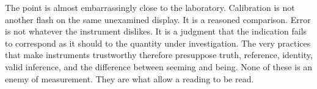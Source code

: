 The point is almost embarrassingly close to the laboratory. Calibration is not another flash on the same unexamined display. It is a reasoned comparison. Error is not whatever the instrument dislikes. It is a judgment that the indication fails to correspond as it should to the quantity under investigation. The very practices that make instruments trustworthy therefore presuppose truth, reference, identity, valid inference, and the difference between seeming and being. None of these is an enemy of measurement. They are what allow a reading to be read.
